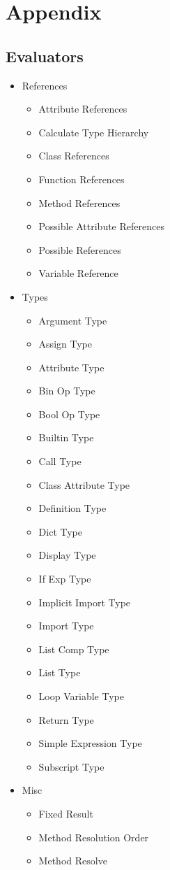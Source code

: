 \documentclass[12pt,halfparskip,DIV11,BCOR10mm]{scrreprt}
\begin{document}

\setcounter{secnumdepth}{-1}
\chapter{Appendix}

\section{Evaluators}


\begin{itemize}
	\item References
	\begin{itemize}
		\item Attribute References
		\item Calculate Type Hierarchy
		\item Class References
		\item Function References
		\item Method References
		\item Possible Attribute References
		\item Possible References
		\item Variable Reference
	\end{itemize}
	\item Types
	\begin{itemize}
		\item Argument Type
		\item Assign Type
		\item Attribute Type
		\item Bin Op Type
		\item Bool Op Type
		\item Builtin Type
		\item Call Type
		\item Class Attribute Type
		\item Definition Type
		\item Dict Type
		\item Display Type
		\item If Exp Type
		\item Implicit Import Type
		\item Import Type
		\item List Comp Type
		\item List Type
		\item Loop Variable Type
		\item Return Type
		\item Simple Expression Type
		\item Subscript Type
	\end{itemize}
	\item Misc
	\begin{itemize}
		\item Fixed Result
		\item Method Resolution Order
		\item Method Resolve
	\end{itemize}
\end{itemize}
\listoffigures



\end{document}
